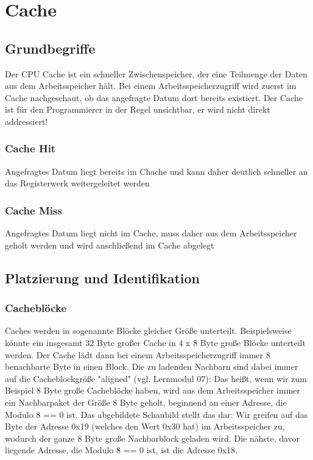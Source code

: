 \section{Cache}
	\subsection{Grundbegriffe}
		Der CPU Cache ist ein schneller Zwischenspeicher, der eine Teilmenge der Daten aus dem Arbeitsspeicher hält. Bei einem Arbeitsspeicherzugriff wird zuerst im Cache nachgeschaut, ob das angefragte Datum dort bereits existiert. Der Cache ist für den Programmierer in der Regel unsichtbar, er wird nicht direkt addressiert!
		\subsubsection{Cache Hit}
			Angefragtes Datum liegt bereits im Chache und kann daher deutlich schneller an das Registerwerk weitergeleitet werden
		\subsubsection{Cache Miss}
			Angefragtes Datum liegt nicht im Cache, muss daher aus dem Arbeitsspeicher geholt werden und wird anschließend im Cache abgelegt
	\subsection{Platzierung und Identifikation}
		\subsubsection{Cacheblöcke}
			Caches werden in sogenannte Blöcke gleicher Größe unterteilt. Beispielsweise könnte ein insgesamt 32 Byte großer Cache in 4 x 8 Byte große Blöcke unterteilt werden. Der Cache lädt dann bei einem Arbeitsspeicherzugriff immer 8 benachbarte Byte in einen Block.
			\newline \newline
			Die zu ladenden Nachbarn sind dabei immer auf die Cacheblockgröße "aligned" (vgl. Lernmodul 07): Das heißt, wenn wir zum Beispiel 8 Byte große Cacheblöcke haben, wird aus dem Arbeitsspeicher immer ein Nachbarpaket der Größe 8 Byte geholt, beginnend an einer Adresse, die Modulo 8 == 0 ist. 
			\newline \newline
			Das abgebildete Schaubild stellt das dar: Wir greifen auf das Byte der Adresse 0x19 (welches den Wert 0x30 hat) im Arbeitsspeicher zu, wodurch der ganze 8 Byte große Nachbarblock geladen wird. Die nähste, davor liegende Adresse, die Modulo 8 == 0 ist, ist die Adresse 0x18.
